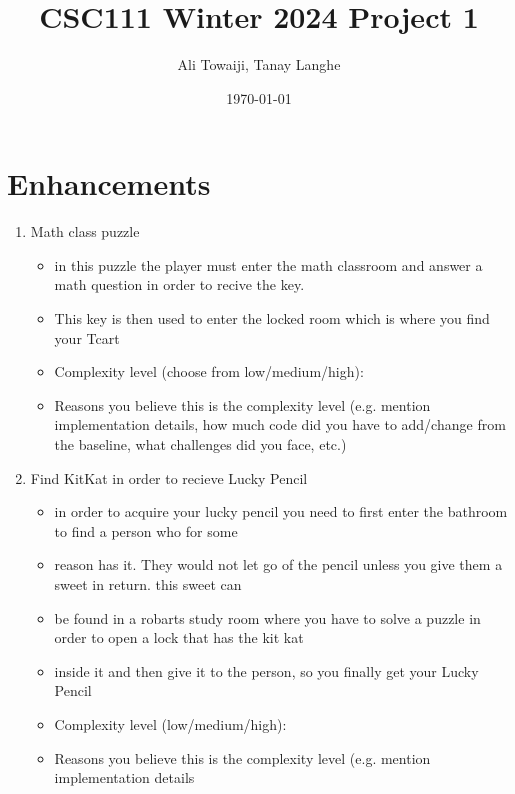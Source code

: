 \documentclass[11pt]{article}
\title{CSC111 Winter 2024 Project 1}
\author{Ali Towaiji, Tanay Langhe}
\date{\today}
\begin{document}
\maketitle

\section*{Enhancements}


\begin{enumerate}

\item Math class puzzle
	\begin{itemize}
	\item in this puzzle the player must enter the math classroom and answer a math question in order to recive the key.
	\item This key is then used to enter the locked room which is where you find your Tcart
	\item Complexity level (choose from low/medium/high):
	\item Reasons you believe this is the complexity level (e.g. mention implementation details, how much code did you have to add/change from the baseline, what challenges did you face, etc.)
	\end{itemize}


\item Find KitKat in order to recieve Lucky Pencil
	\begin{itemize}
	\item in order to acquire your lucky pencil you need to first enter the bathroom to find a person who for some
	\item reason has it. They would not let go of the pencil unless you give them a sweet in return. this sweet can
	\item be found in a robarts study room where you have to solve a puzzle in order to open a lock that has the kit kat
	\item inside it and then give it to the person, so you finally get your Lucky Pencil
	\item Complexity level (low/medium/high):
	\item Reasons you believe this is the complexity level (e.g. mention implementation details
	\end{itemize}


\end{enumerate}
\end{document}
